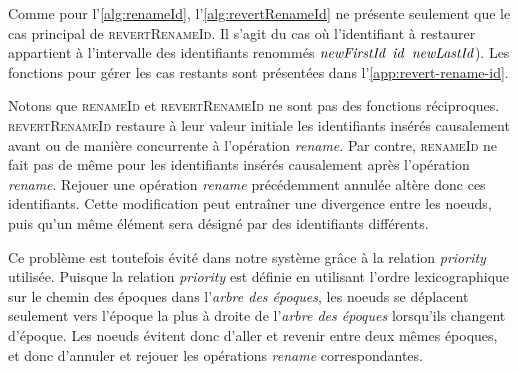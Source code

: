 
Comme pour l'\autoref{alg:renameId}, l'\autoref{alg:revertRenameId} ne présente seulement que le cas principal de \textsc{revertRenameId}.
Il s'agit du cas où l'identifiant à restaurer appartient à l'intervalle des identifiants renommés $\mathit{newFirstId}$ \leqid $\mathit{id}$ \leqid $\mathit{newLastId}$).
Les fonctions pour gérer les cas restants sont présentées dans l'\autoref{app:revert-rename-id}.

Notons que \textsc{renameId} et \textsc{revertRenameId} ne sont pas des fonctions réciproques.
\textsc{revertRenameId} restaure à leur valeur initiale les identifiants insérés causalement avant ou de manière concurrente à l'opération \emph{rename}.
Par contre, \textsc{renameId} ne fait pas de même pour les identifiants insérés causalement après l'opération \emph{rename}.
Rejouer une opération \emph{rename} précédemment annulée altère donc ces identifiants.
Cette modification peut entraîner une divergence entre les noeuds, puis qu'un même élément sera désigné par des identifiants différents.

Ce problème est toutefois évité dans notre système grâce à la relation \emph{priority} utilisée.
Puisque la relation \emph{priority} est définie en utilisant l'ordre lexicographique sur le chemin des époques dans l'\emph{arbre des époques}, les noeuds se déplacent seulement vers l'époque la plus à droite de l'\emph{arbre des époques} lorsqu'ils changent d'époque.
Les noeuds évitent donc d'aller et revenir entre deux mêmes époques, et donc d'annuler et rejouer les opérations \emph{rename} correspondantes.
